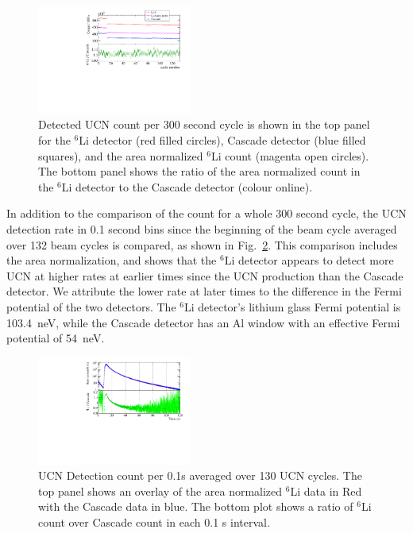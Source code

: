\documentclass[twocolumn]{bmcart}
\begin{document}
\begin{figure}[!htpb]
\centering \includegraphics[width=0.45\textwidth]{figures/cascade_to_li_ratecompare.pdf}
\caption{Detected UCN count per 300 second cycle is shown in the top
  panel for the ${^6}$Li detector (red filled circles), Cascade
  detector (blue filled squares), and the area normalized ${^6}$Li
  count (magenta open circles).  The bottom panel shows the ratio of
  the area normalized count in the $^{6}$Li detector to the Cascade
  detector (colour online).}
\label{fig:ratecompare}
\end{figure}

In addition to the comparison of the count for a whole 300 second
cycle, the UCN detection rate in 0.1 second bins since the beginning
of the beam cycle averaged over 132 beam cycles is compared, as shown
in Fig.~\ref{fig:averagedRate}.  This comparison includes the area
normalization, and shows that the $^{6}$Li detector appears to detect
more UCN at higher rates at earlier times since the UCN production
than the Cascade detector.  We attribute the lower rate at later times
to the difference in the Fermi potential of the two detectors.  The
$^6$Li detector's lithium glass Fermi potential is 103.4~neV, while
the Cascade detector has an Al window with an effective Fermi
potential of 54~neV.  


\begin{figure}[!htpb]
\centering \includegraphics[width = 0.45\textwidth]{figures/cascade_to_li_130cycleavg.pdf}
\caption{UCN Detection count per 0.1s averaged over 130 UCN cycles.
  The top panel shows an overlay of the area normalized $^6$Li data in
  Red with the Cascade data in blue.  The bottom plot shows a ratio of
  $^6$Li count over Cascade count in each 0.1 s interval. }
\label{fig:averagedRate}
\end{figure}
\end{document}
